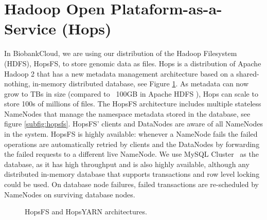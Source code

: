 \section{Hadoop Open Plataform-as-a-Service (Hops)}
In BiobankCloud, we are using our distribution of the Hadoop Filesystem (HDFS), HopsFS, to store genomic data as files.  Hops is a distribution of Apache Hadoop 2 that has a new metadata management architecture based on a shared-nothing, in-memory distributed database, see Figure \ref{fig:hops}. As metadata can now grow to TBs in size (compared to  ~100GB in Apache HDFS \cite{shvachko2010Hdfs}), Hops can scale to store 100s of millions of files.
The HopsFS architecture includes multiple stateless NameNodes that manage the namespace metadata  stored in the database, see figure \ref{subfig:hopsfs}. HopsFS' clients and DataNodes are aware of all NameNodes in the system. HopsFS is  highly available: whenever a NameNode fails the failed operations are automatically retried by clients and the DataNodes by forwarding the failed requests to a different live NameNode. We use MySQL Cluster~\cite{ronstrom2005recovery} as the database, as it has high throughput and is also highly available, although any distributed in-memory database that supports transactions and row level locking could be used. On database node failures, failed transactions are re-scheduled by NameNodes on surviving database nodes.
\vspace{-5mm}
\begin{figure}[!ht]
    \hfill
    \caption{HopsFS and HopsYARN architectures.}
    \label{fig:hops}
\end{figure}
\vspace{-5mm}


